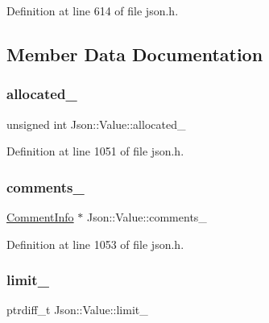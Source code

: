 Definition at line 614 of file json.\+h.



\subsection{Member Data Documentation}
\hypertarget{class_json_1_1_value_ae0126c80dc4907aad94088553fc7632b}{}\label{class_json_1_1_value_ae0126c80dc4907aad94088553fc7632b} 
\subsubsection{\texorpdfstring{allocated\+\_\+}{allocated\_}}
{\footnotesize\ttfamily unsigned int Json\+::\+Value\+::allocated\+\_\+\hspace{0.3cm}{\ttfamily [private]}}



Definition at line 1051 of file json.\+h.

\hypertarget{class_json_1_1_value_ac6b962f72746177719ed5754dd639d6f}{}\label{class_json_1_1_value_ac6b962f72746177719ed5754dd639d6f} 
\subsubsection{\texorpdfstring{comments\+\_\+}{comments\_}}
{\footnotesize\ttfamily \hyperlink{struct_json_1_1_value_1_1_comment_info}{Comment\+Info} $\ast$ Json\+::\+Value\+::comments\+\_\+\hspace{0.3cm}{\ttfamily [private]}}



Definition at line 1053 of file json.\+h.

\hypertarget{class_json_1_1_value_afe377e25f6d3b5b8ea7221c84f29412a}{}\label{class_json_1_1_value_afe377e25f6d3b5b8ea7221c84f29412a} 
\subsubsection{\texorpdfstring{limit\+\_\+}{limit\_}}
{\footnotesize\ttfamily ptrdiff\+\_\+t Json\+::\+Value\+::limit\+\_\+\hspace{0.3cm}{\ttfamily [private]}}




